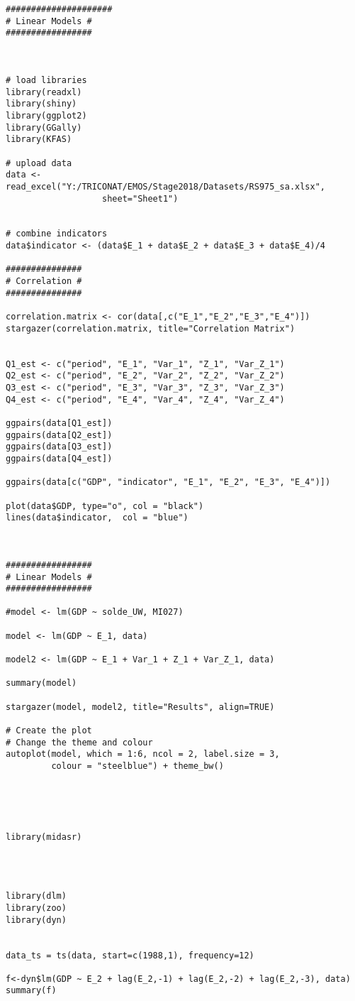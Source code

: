 \begin{lstlisting}
#####################
# Linear Models #
#################



# load libraries
library(readxl)
library(shiny)
library(ggplot2)
library(GGally)
library(KFAS)

# upload data
data <- read_excel("Y:/TRICONAT/EMOS/Stage2018/Datasets/RS975_sa.xlsx",
                   sheet="Sheet1")


# combine indicators
data$indicator <- (data$E_1 + data$E_2 + data$E_3 + data$E_4)/4

###############
# Correlation #
###############

correlation.matrix <- cor(data[,c("E_1","E_2","E_3","E_4")])
stargazer(correlation.matrix, title="Correlation Matrix")


Q1_est <- c("period", "E_1", "Var_1", "Z_1", "Var_Z_1")
Q2_est <- c("period", "E_2", "Var_2", "Z_2", "Var_Z_2")
Q3_est <- c("period", "E_3", "Var_3", "Z_3", "Var_Z_3")
Q4_est <- c("period", "E_4", "Var_4", "Z_4", "Var_Z_4")

ggpairs(data[Q1_est])
ggpairs(data[Q2_est])
ggpairs(data[Q3_est])
ggpairs(data[Q4_est])

ggpairs(data[c("GDP", "indicator", "E_1", "E_2", "E_3", "E_4")])

plot(data$GDP, type="o", col = "black")
lines(data$indicator,  col = "blue")



#################
# Linear Models #
#################

#model <- lm(GDP ~ solde_UW, MI027)

model <- lm(GDP ~ E_1, data)

model2 <- lm(GDP ~ E_1 + Var_1 + Z_1 + Var_Z_1, data)

summary(model)

stargazer(model, model2, title="Results", align=TRUE)

# Create the plot
# Change the theme and colour
autoplot(model, which = 1:6, ncol = 2, label.size = 3,
         colour = "steelblue") + theme_bw()





library(midasr)




library(dlm)
library(zoo)
library(dyn)


data_ts = ts(data, start=c(1988,1), frequency=12)

f<-dyn$lm(GDP ~ E_2 + lag(E_2,-1) + lag(E_2,-2) + lag(E_2,-3), data)
summary(f)



\end{lstlisting}
